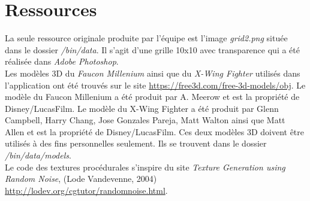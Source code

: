 \section{Ressources}
\label{s:ressources}

La seule ressource originale produite par l'équipe est l'image \textit{grid2.png} située dans le dossier \textit{/bin/data}.
Il s'agit d'une grille 10x10 avec transparence qui a été réalisée dans \textit{Adobe Photoshop}.\\

Les modèles 3D du \textit{Faucon Millenium} ainsi que du \textit{X-Wing Fighter} utilisés dans l'application ont été trouvés sur le site \url{https://free3d.com/free-3d-models/obj}.
Le modèle du Faucon Millenium a été produit par A. Meerow et est la propriété de Disney/LucasFilm.
Le modèle du X-Wing Fighter a été produit par Glenn Campbell, Harry Chang, Jose Gonzales Pareja, Matt Walton ainsi que Matt Allen et est la propriété de Disney/LucasFilm.
Ces deux modèles 3D doivent être utilisés à des fins personnelles seulement.
Ils se trouvent dans le dossier \textit{/bin/data/models}.\\ 

Le code des textures procédurales s'inspire du site \textit{Texture Generation using Random Noise}, (Lode Vandevenne, 2004) \url{http://lodev.org/cgtutor/randomnoise.html}.
\label{src-procedural-texture}
